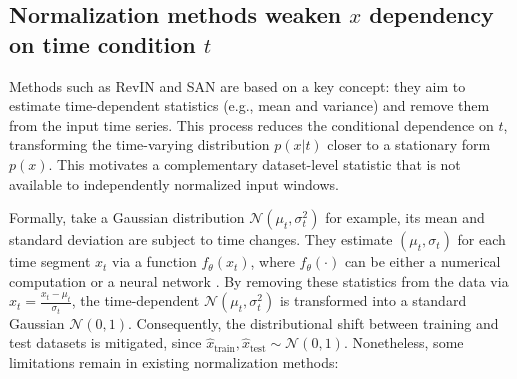 \documentclass[sigconf,anonymous,review]{acmart}
\begin{document}


\subsection{Normalization methods weaken $x$ dependency on time condition $t$}
\label{Normalization_weaken_x_on_t}
Methods such as RevIN \citep{kim2021RevIN} and SAN \citep{liu2023SAN} are based on a key concept: they aim to estimate time-dependent statistics (e.g., mean and variance) and remove them from the input time series.
This process reduces the conditional dependence on $t$, transforming the time-varying distribution $p(x |t)$ closer to a stationary form $p(x)$.
This motivates a complementary dataset-level statistic that is not available
to independently normalized input windows.

Formally, take a Gaussian distribution $\mathcal{N}(\mu_t, \sigma_t^2)$ for example, its mean and standard deviation are subject to time changes.
They estimate $(\mu_t, \sigma_t)$ for each time segment $x_t$ via a function $f_\theta(x_t)$, where $f_\theta(\cdot)$ can be either a numerical computation \citep{kim2021RevIN} or a neural network \citep{fan2023dish, liu2023SAN, han2024sin}.
By removing these statistics from the data via $
\hat{x}_t = \frac{x_t - \mu_t}{\sigma_t}
$, the time-dependent $\mathcal{N}(\mu_t, \sigma_t^2)$ is transformed into a standard Gaussian $\mathcal{N}(0, 1)$.
Consequently, the distributional shift between training and test datasets is mitigated, since $\hat{x}_{\text{train}}, \hat{x}_{\text{test}} \sim \mathcal{N}(0, 1)$.
Nonetheless, some limitations remain in existing normalization methods:
\end{document}
